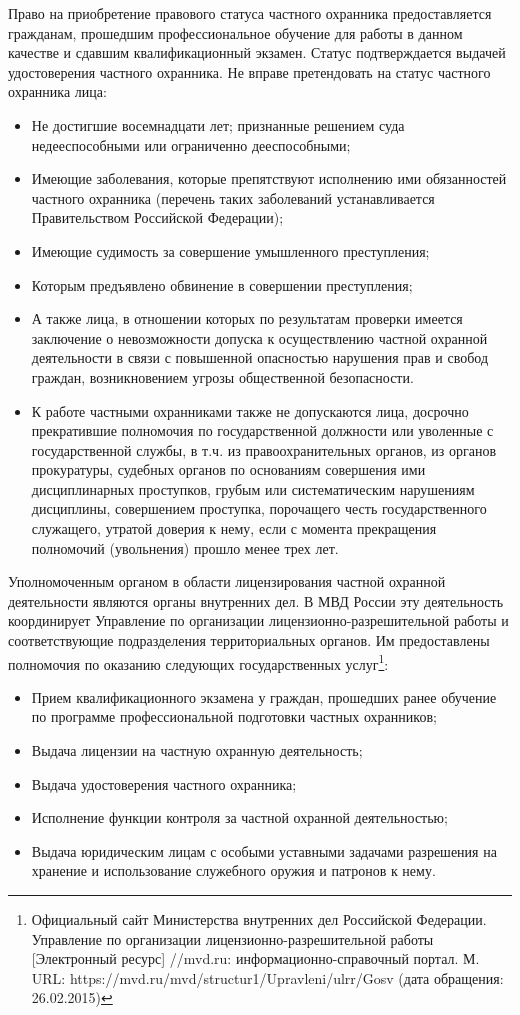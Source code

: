 \documentclass[a4paper,12pt,fleqn]{article} %
\begin{document}
Право на приобретение правового статуса частного охранника предоставляется гражданам, прошедшим профессиональное обучение для работы в данном качестве и сдавшим квалификационный экзамен. Статус подтверждается выдачей удостоверения частного охранника. Не вправе претендовать на статус частного охранника лица:
\begin{itemize}
	\item Не достигшие восемнадцати лет; признанные решением суда недееспособными или ограниченно дееспособными;
	\item Имеющие заболевания, которые препятствуют исполнению ими обязанностей частного охранника (перечень таких заболеваний устанавливается Правительством Российской Федерации);
	\item Имеющие судимость за совершение умышленного преступления; 
	\item Которым предъявлено обвинение в совершении преступления; 
	\item А также лица, в отношении которых по результатам проверки имеется заключение о невозможности допуска к осуществлению частной охранной деятельности в связи с повышенной опасностью нарушения прав и свобод граждан, возникновением угрозы общественной безопасности. 
	\item К работе частными охранниками также не допускаются лица, досрочно прекратившие полномочия по государственной должности или уволенные с государственной службы, в т.ч. из правоохранительных органов, из органов прокуратуры, судебных органов по основаниям совершения ими дисциплинарных проступков, грубым или систематическим нарушениям дисциплины, совершением проступка, порочащего честь государственного служащего, утратой доверия к нему, если с момента прекращения полномочий (увольнения) прошло менее трех лет. 
\end{itemize}

Уполномоченным органом в области лицензирования частной охранной деятельности являются органы внутренних дел. В МВД России эту деятельность координирует Управление по организации лицензионно-разрешительной работы и соответствующие подразделения территориальных органов. Им предоставлены полномочия по оказанию следующих государственных услуг\footnote{Официальный сайт Министерства внутренних дел Российской Федерации. Управление по организации лицензионно-разрешительной работы [Электронный ресурс] //mvd.ru: информационно-справочный портал. М. URL: https://mvd.ru/mvd/structur1/Upravleni/ulrr/Gosv (дата обращения: 26.02.2015)}:

\begin{itemize}
	\item Прием квалификационного экзамена у граждан, прошедших ранее обучение по программе профессиональной подготовки частных охранников;
	\item Выдача лицензии на частную охранную деятельность;
	\item Выдача удостоверения частного охранника;
	\item Исполнение функции контроля за частной охранной деятельностью;
	\item Выдача юридическим лицам с особыми уставными задачами разрешения на хранение и использование служебного оружия и патронов к нему.
\end{itemize}
\end{document}
